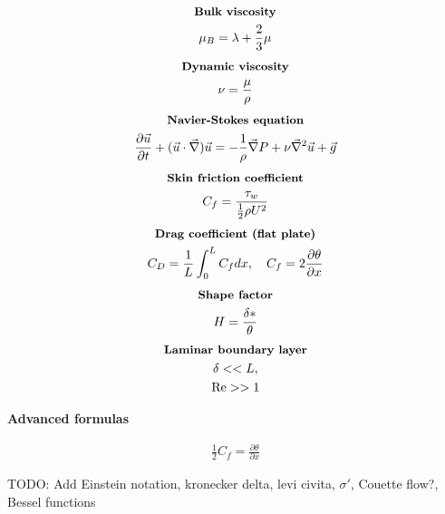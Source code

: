\documentclass[10pt, a4paper]{article}
\newcommand{\derivative}[2]{\frac{\partial #1}{\partial #2}}
\begin{document}
\begin{multicols*}{2}
    \begin{gather*}
        \textbf{\small Bulk viscosity} \\
        \mu_B = \lambda + \frac23 \mu
    \end{gather*}
    \begin{gather*}
        \textbf{\small Dynamic viscosity} \\
        \nu = \frac{\mu}{\rho}
    \end{gather*}
    \begin{gather*}
        \textbf{\small Navier-Stokes equation} \\
        \derivative{ \vec{u}}{t} + (\vec{u}\cdot \vec{\nabla})\vec{u} = 
        -\frac{1}{\rho}\vec{\nabla}P + \nu \vec{\nabla}^2 \vec{u} + \vec{g}
    \end{gather*}
    \begin{gather*}
        \textbf{\small Skin friction coefficient} \\
        C_f = \frac{\tau_w}{\frac12 \rho U^2}
    \end{gather*}
    \begin{gather*}
        \textbf{\small Drag coefficient (flat plate)} \\
        C_D = \frac{1}{L}\int_0^L C_f dx, \quad C_f = 2\derivative{ \theta}{x}
    \end{gather*}
    \begin{gather*}
        \textbf{\small Shape factor} \\
        H = \frac{\delta *}{\theta}
    \end{gather*}
    \begin{gather*}
        \textbf{\small Laminar boundary layer} \\
        \delta << L, \\
        \text{Re} >> 1
    \end{gather*}
\end{multicols*}
\begin{center}
    \Large
    \textbf{Advanced formulas}
    \vspace{0.5cm}
\end{center}
\begin{multicols*}{2}
    \begin{gather*}
        \frac12 C_f = \derivative{\theta}{x}    
    \end{gather*}
\end{multicols*}

TODO: Add Einstein notation, kronecker delta, levi civita, $\sigma '$, Couette flow?, Bessel functions
\end{document}
